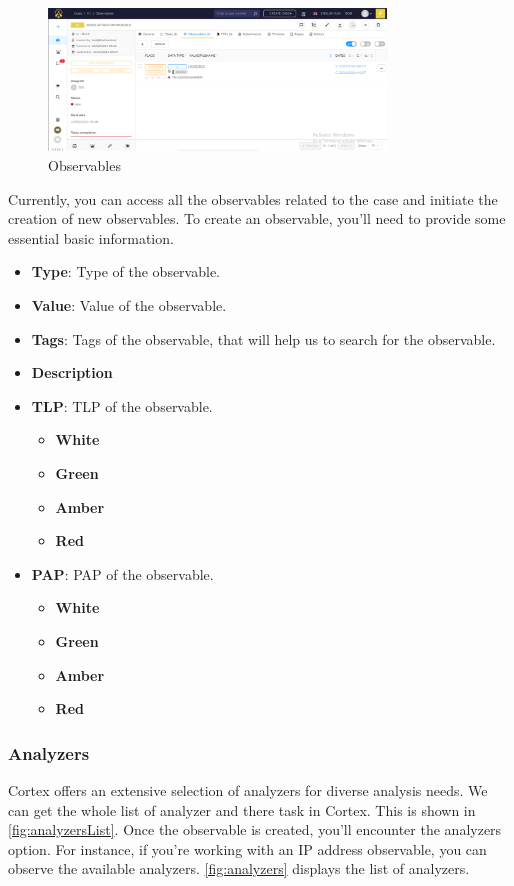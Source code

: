 \documentclass{article}
\begin{document}
\begin{figure}[H]
    \centering
    \includegraphics[width=0.8\textwidth]{img28.png}
    \caption{Observables}
    \label{fig:observables}
\end{figure}
 Currently, you can access all the observables related to the case and initiate the creation of new observables. To create an observable, you'll need to provide some essential basic information.
\begin{itemize}
    \item \textbf{Type}: Type of the observable.
    \item \textbf{Value}: Value of the observable.
    \item \textbf{Tags}: Tags of the observable, that will help us to search for the observable.
    \item \textbf{Description}
     \item \textbf{TLP}: TLP of the observable.
        \begin{itemize}
            \item \textbf{White} 
            \item \textbf{Green} 
            \item \textbf{Amber} 
            \item \textbf{Red} 
        \end{itemize}
    \item \textbf{PAP}: PAP of the observable.
        \begin{itemize}
            \item \textbf{White} 
            \item \textbf{Green} 
            \item \textbf{Amber} 
            \item \textbf{Red} 
        \end{itemize}
\end{itemize}

\subsubsection{Analyzers}
Cortex offers an extensive selection of analyzers for diverse analysis needs. We can get the whole list of analyzer and there task in Cortex. This is shown in \ref{fig:analyzersList}. Once the observable is created, you'll encounter the analyzers option. For instance, if you're working with an IP address observable, you can observe the available analyzers. \ref{fig:analyzers} displays the list of analyzers.\\
\end{document}
